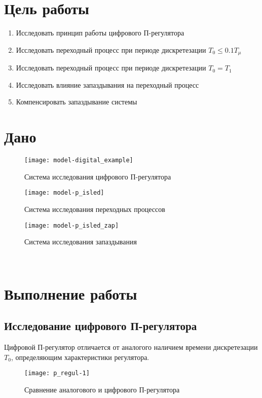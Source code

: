


    


    \section{Цель работы}
    \begin{enumerate}
        \item Исследовать принцип работы цифрового П-регулятора
        \item Исследовать переходный процесс при периоде дискретезации $T_0\leq0.1T_\mu$
        \item Исследовать переходный процесс при периоде дискретезации $T_0=T_1$
        \item Исследовать влияние запаздывания на переходный процесс
        \item Компенсировать запаздывание системы
    \end{enumerate}


    \section{Дано}
    \begin{figure}[H]
        \centering\texttt{[image: model-digital\_example]}
        \caption{Система исследования цифрового П-регулятора}
    \end{figure}
    \begin{figure}[H]
        \centering\texttt{[image: model-p\_isled]}
        \caption{Система исследования переходных процессов}
    \end{figure}
    \begin{figure}[H]
        \centering\texttt{[image: model-p\_isled\_zap]}
        \caption{Система исследования запаздывания}
    \end{figure}

    \begin{center}
        \noindent{}\\
    \end{center}


    \section{Выполнение работы}

    \subsection{Исследование цифрового П-регулятора}
    Цифровой П-регулятор отличается от аналогого наличием времени дискретезации $T_0$,
    определяющим характеристики регулятора.
    \begin{figure}[H]
        \centering\texttt{[image: p\_regul-1]}
        \caption{Сравнение аналогового и цифрового П-регулятора}
    \end{figure}

